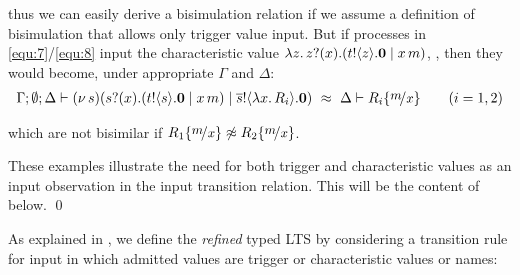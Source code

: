 \begin{example}
	\noi thus we can easily derive a bisimulation relation if we 
	assume a definition of bisimulation that allows only trigger value input.
%
	But if processes in \eqref{equ:7}/\eqref{equ:8}
	input the characteristic value
	$\lambda z.\,z ? (x) . ( t ! \langle z \rangle . \mathbf{0} \;|\; x\, {m})$,
	, 
	then they would become, under appropriate $\Gamma$ and $\Delta$:
%
%
%
	\begin{eqnarray*}
		\Gamma; \es; \Delta \proves \newsp{s}{\binp{s}{x} (\bout{t}{s} \inact \Par \appl{x}{m}) \Par \bout{\dual{s}}{\abs{x} R_i} \inact}\ \wbc\ \Delta \proves R_i \subst{m}{x}
	\qquad (i=1,2)
	\end{eqnarray*}
%

	\noi which are not bisimilar if $R_1 \subst{m}{x} \not\wbc R_2 \subst{m}{x}$.
	
	These examples illustrate the need for both 
	trigger and characteristic values 
	as an input observation in the input transition relation.   %
	This will be the content of  below.
	\qed
\end{example}

\noi As explained in , 
we define the
\emph{refined} typed LTS
by considering a transition rule for input in which admitted values are
trigger or characteristic values or names:


